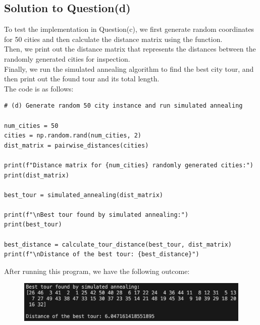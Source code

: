 \documentclass[a4paper]{article}
\begin{document}
\subsection{Solution to Question(d)}
To test the implementation in Question(c), we first generate random coordinates for 50 cities and then calculate the distance matrix using the  function.\\
Then, we print out the distance matrix that represents the distances between the randomly generated cities for inspection.\\
Finally, we run the simulated annealing algorithm to find the best city tour, and then print out the found tour and its total length.\\
The code is as follows:
\begin{verbatim}
# (d) Generate random 50 city instance and run simulated annealing

num_cities = 50
cities = np.random.rand(num_cities, 2)
dist_matrix = pairwise_distances(cities)

print(f"Distance matrix for {num_cities} randomly generated cities:")
print(dist_matrix)

best_tour = simulated_annealing(dist_matrix)

print(f"\nBest tour found by simulated annealing:")
print(best_tour)

best_distance = calculate_tour_distance(best_tour, dist_matrix)
print(f"\nDistance of the best tour: {best_distance}")
\end{verbatim}
After running this program, we have the following outcome:
\begin{figure}[H]
    \centering
    \includegraphics[width=0.75\linewidth]{TSP（Optimal）.png}
\end{figure}
\end{document}
